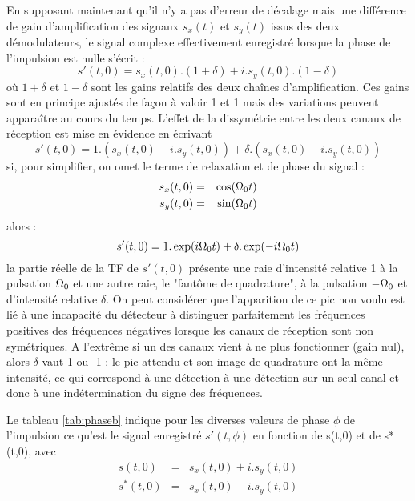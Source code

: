 En supposant maintenant qu'il n'y a pas d'erreur de décalage mais une différence de gain 
d'amplification des signaux $s_x(t)$ et $s_y(t)$ issus des deux démodulateurs, le signal 
complexe effectivement enregistré lorsque la phase de l'impulsion est nulle s'écrit :
\begin{equation}
s'(t,0) = s_x(t,0).(1+\delta) + i.s_y(t,0).(1-\delta) 
\end{equation}
où $1+\delta$ et $1-\delta$ sont les gains relatifs des deux chaînes d'amplification. 
Ces gains sont en principe ajustés de façon à valoir 1 et 1 
mais des variations peuvent apparaître au cours du temps. 
L'effet de la dissymétrie entre les deux canaux de réception est mise en évidence 
en écrivant 
\begin{equation}
s'(t,0) = 1.(s_x(t,0) + i.s_y(t,0)) + \delta.(s_x(t,0) - i.s_y(t,0)) 
\end{equation}
si, pour simplifier, on omet le terme de relaxation et de phase du signal :
\begin{eqnarray}
s_x(t,0) &=& \cos(\Omega_0 t) \\
s_y(t,0) &=& \sin(\Omega_0 t)
\end{eqnarray}
alors :
\begin{equation}
		s'(t,0) = 1.\exp(i \Omega_0 t) + \delta.\exp(-i \Omega_0 t)
\end{equation}
la partie réelle de la TF de $s'(t,0)$ présente une raie 
d'intensité relative 1 à la pulsation $\Omega_0$ et une autre raie, 
le "fantôme de quadrature", à la 
pulsation $-\Omega_0$ et d'intensité relative $\delta$. 
On peut considérer que l'apparition de ce pic non 
voulu est lié à une incapacité du détecteur à distinguer parfaitement les fréquences 
positives des fréquences négatives lorsque les canaux de réception sont non 
symétriques. 
A l'extrême si un des canaux vient à ne plus fonctionner (gain nul), alors $\delta$ 
vaut 1 ou -1 : le pic attendu et son image de quadrature ont la même intensité, ce
qui correspond à une détection à une détection sur un seul canal et donc
à une indétermination du signe des fréquences.
 
Le tableau \ref{tab:phaseb} indique pour les diverses valeurs de phase $\phi$ de l'impulsion 
ce qu'est le signal enregistré $s'(t,\phi)$ en 
fonction de s(t,0) et de s*(t,0), avec 
\begin{eqnarray}
s(t,0) & = & s_x(t,0) + i.s_y(t,0) \\
s^*(t,0) & = & s_x(t,0) - i.s_y(t,0)
\end{eqnarray}

